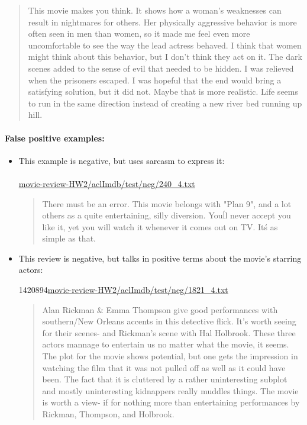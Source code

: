 \documentclass{article}
\begin{document}
\begin{itemize}
    \begin{quotation}
        This movie makes you think. It shows how a woman's weaknesses can result in nightmares for others. Her physically aggressive behavior is more often seen in men than women, so it made me feel even more uncomfortable to see the way the lead actress behaved. I think that women might think about this behavior, but I don't think they act on it. The dark scenes added to the sense of evil that needed to be hidden. I was relieved when the prisoners escaped. I was hopeful that the end would bring a satisfying solution, but it did not. Maybe that is more realistic. Life seems to run in the same direction instead of creating a new river bed running up hill.
    \end{quotation}
\end{itemize}

\paragraph{False positive examples:}

\begin{itemize}
\item This example is negative, but uses sarcasm to express it:

    \paragraph{} \url{movie-review-HW2/aclImdb/test/neg/240_4.txt}

    \begin{quotation}
    There must be an error. This movie belongs with "Plan 9", and a lot others as a quite entertaining, silly diversion. You\'ll never accept you like it, yet you will watch it whenever it comes out on TV. It\'s as simple as that.
    \end{quotation}

\item This review is negative, but talks in positive terms about the movie's starring actors:

1420894\url{movie-review-HW2/aclImdb/test/neg/1821_4.txt}

    \begin{quotation}
    Alan Rickman \& Emma Thompson give good performances with southern/New Orleans accents in this detective flick. It's worth seeing for their scenes- and Rickman's scene with Hal Holbrook. These three actors mannage to entertain us no matter what the movie, it seems. The plot for the movie shows potential, but one gets the impression in watching the film that it was not pulled off as well as it could have been. The fact that it is cluttered by a rather uninteresting subplot and mostly uninteresting kidnappers really muddles things. The movie is worth a view- if for nothing more than entertaining performances by Rickman, Thompson, and Holbrook.
    \end{quotation} 
\end{itemize}
\end{document}
